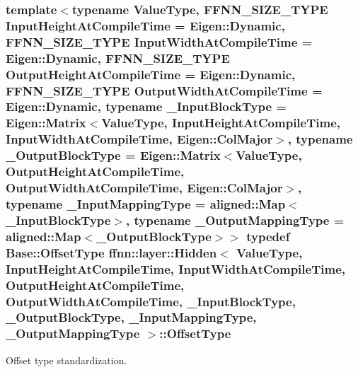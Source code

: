 \hypertarget{classffnn_1_1layer_1_1_hidden_a4a191bc002b2545231a3d80c99004693}{
\subsubsection[{Offset\-Type}]{\setlength{\rightskip}{0pt plus 5cm}template$<$typename Value\-Type, F\-F\-N\-N\-\_\-\-S\-I\-Z\-E\-\_\-\-T\-Y\-P\-E Input\-Height\-At\-Compile\-Time = Eigen\-::\-Dynamic, F\-F\-N\-N\-\_\-\-S\-I\-Z\-E\-\_\-\-T\-Y\-P\-E Input\-Width\-At\-Compile\-Time = Eigen\-::\-Dynamic, F\-F\-N\-N\-\_\-\-S\-I\-Z\-E\-\_\-\-T\-Y\-P\-E Output\-Height\-At\-Compile\-Time = Eigen\-::\-Dynamic, F\-F\-N\-N\-\_\-\-S\-I\-Z\-E\-\_\-\-T\-Y\-P\-E Output\-Width\-At\-Compile\-Time = Eigen\-::\-Dynamic, typename \-\_\-\-Input\-Block\-Type = Eigen\-::\-Matrix$<$\-Value\-Type, Input\-Height\-At\-Compile\-Time, Input\-Width\-At\-Compile\-Time, Eigen\-::\-Col\-Major$>$, typename \-\_\-\-Output\-Block\-Type = Eigen\-::\-Matrix$<$\-Value\-Type, Output\-Height\-At\-Compile\-Time, Output\-Width\-At\-Compile\-Time, Eigen\-::\-Col\-Major$>$, typename \-\_\-\-Input\-Mapping\-Type = aligned\-::\-Map$<$\-\_\-\-Input\-Block\-Type$>$, typename \-\_\-\-Output\-Mapping\-Type = aligned\-::\-Map$<$\-\_\-\-Output\-Block\-Type$>$$>$ typedef {\bf Base\-::\-Offset\-Type} {\bf ffnn\-::layer\-::\-Hidden}$<$ Value\-Type, Input\-Height\-At\-Compile\-Time, Input\-Width\-At\-Compile\-Time, Output\-Height\-At\-Compile\-Time, Output\-Width\-At\-Compile\-Time, \-\_\-\-Input\-Block\-Type, \-\_\-\-Output\-Block\-Type, \-\_\-\-Input\-Mapping\-Type, \-\_\-\-Output\-Mapping\-Type $>$\-::{\bf Offset\-Type}}}\label{classffnn_1_1layer_1_1_hidden_a4a191bc002b2545231a3d80c99004693}


Offset type standardization. 

